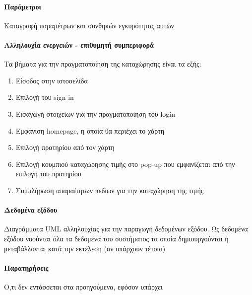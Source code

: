 \paragraph{Παράμετροι}
Καταγραφή παραμέτρων και συνθηκών εγκυρότητας αυτών
\paragraph{Αλληλουχία ενεργειών - επιθυμητή συμπεριφορά}
Τα βήματα για την πραγματοποίηση της καταχώρησης είναι τα εξής:
\begin{enumerate}
	\item Είσοδος στην ιστοσελίδα
	\item Επιλογή του sign in
	\item Εισαγωγή στοιχείων για την πραγματοποίηση του login
	\item Εμφάνιση homepage, η οποία θα περιέχει το χάρτη
	\item Επιλογή πρατηρίου από τον χάρτη
	\item Επιλογή κουμπιού καταχώρησης τιμής στο pop-up που εμφανίζεται από την επιλογή του πρατηρίου
	\item Συμπλήρωση απαραίτητων πεδίων για την καταχώρηση της τιμής
\end{enumerate}
\paragraph{Δεδομένα εξόδου}
Διαγράμματα UML αλληλουχίας για την παραγωγή δεδομένων εξόδου. Ως δεδομένα εξόδου νοούνται όλα τα
δεδομένα του συστήματος τα οποία δημιουργούνται ή μεταβάλλονται κατά την εκτέλεση (αν υπάρχουν
τέτοια)

\paragraph{Παρατηρήσεις}
Ο,τι δεν εντάσσεται στα προηγούμενα, εφόσον υπάρχει
